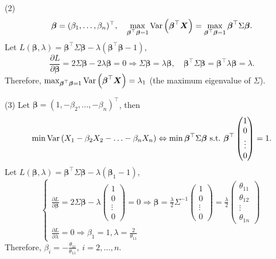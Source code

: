 (2)
\[
\boldsymbol{\beta}=(\beta_{1},\ldots,\beta_{n})^{\top},\quad \max_{\boldsymbol{\beta}^{\top}\boldsymbol{\beta}=1}\operatorname{Var}\left(\boldsymbol{\beta}^{\top}\boldsymbol{X}\right)=\max_{\boldsymbol{\beta}^{\top}\boldsymbol{\beta}=1}\boldsymbol{\beta}^{\top}\Sigma\boldsymbol{\beta}.
\]
Let $L(\boldsymbol{\beta},\lambda)=\boldsymbol{\beta}^{\top}\Sigma\boldsymbol{\beta}-\lambda\left(\boldsymbol{\beta}^{\top}\boldsymbol{\beta}-1\right)$,
\[
\frac{\partial L}{\partial\boldsymbol{\beta}}=2\Sigma\boldsymbol{\beta}-2\lambda\boldsymbol{\beta}=0\Rightarrow\Sigma\boldsymbol{\beta}=\lambda\boldsymbol{\beta},\quad \boldsymbol{\beta}^{\top}\Sigma\boldsymbol{\beta}=\boldsymbol{\beta}^{\top}\lambda\boldsymbol{\beta}=\lambda.
\]
Therefore, $\max_{\boldsymbol{\beta}^{\top}\boldsymbol{\beta}=1}\operatorname{Var}\left(\boldsymbol{\beta}^{\top}\boldsymbol{X}\right)=\lambda_{1}$ (the maximum eigenvalue of $\Sigma$).

(3) Let $\boldsymbol{\beta}=(1,-\beta_{2},\ldots,-\beta_{n})^{\top}$, then
\[
\min\Var\left(X_{1}-\beta_{2}X_{2}-\ldots-\beta_{n}X_{n}\right)\Leftrightarrow\min\boldsymbol{\beta}^{\top}\Sigma\boldsymbol{\beta}\ \text{s.t.}\ \boldsymbol{\beta}^{\top}\begin{pmatrix}1\\0\\\vdots\\0\end{pmatrix}=1.
\]
Let $L(\boldsymbol{\beta},\lambda)=\boldsymbol{\beta}^{\top}\Sigma\boldsymbol{\beta}-\lambda\left(\boldsymbol{\beta}_{1}-1\right)$,
\[
\begin{cases}
\frac{\partial L}{\partial\boldsymbol{\beta}}=2\Sigma\boldsymbol{\beta}-\lambda\begin{pmatrix}1\\0\\\vdots\\0\end{pmatrix}=0\Rightarrow\boldsymbol{\beta}=\frac{\lambda}{2}\Sigma^{-1}\begin{pmatrix}1\\0\\\vdots\\0\end{pmatrix}=\frac{\lambda}{2}\begin{pmatrix}\theta_{11}\\ \theta_{12}\\ \vdots\\ \theta_{1n}\end{pmatrix}\\
\frac{\partial L}{\partial\lambda}=0\Rightarrow\beta_{1}=1,\lambda=\frac{2}{\theta_{11}}
\end{cases}
\]
Therefore, $\beta_{i}=-\frac{\theta_{1i}}{\theta_{11}},\ i=2,\ldots,n$.

